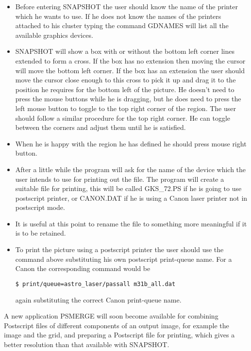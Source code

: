 \documentclass[twoside,11pt]{article}
\begin{document}
\begin{itemize}
\item Before entering SNAPSHOT the user should know the name of the printer
which he wants to use. If he does not know the names of the printers attached
to his cluster typing the command GDNAMES will list all the available graphics 
devices.
\item SNAPSHOT will show a box with or without the bottom left corner lines
extended to form a cross. If the box has no extension then moving the cursor
will move the bottom left corner. If the box has an extension the user should
move the cursor close enough to this cross to pick it up and drag it to
the position he requires for the bottom left of the picture. He doesn't need
to press the mouse buttons while he is dragging, but he does need to press the
left mouse button to toggle to the top right corner of the 
region. The user should follow a similar procedure for the top right corner.
He can toggle between the corners and adjust them until he is satisfied.
\item When he is happy with the region he has defined he should press 
mouse right button.
\item After a little while the program will ask for the name of the device
which the user intends to use for printing out the file. The program will
create a suitable file for printing, this will be called GKS\_72.PS if he is
going to use postscript printer, or CANON.DAT if he is using a Canon laser
printer not in postscript mode.
\item It is useful at this point to rename the file to something more 
meaningful if it is to be retained.
\item To print the picture using a postscript printer the user should use the 
command above substituting his own postscript print-queue name. For a Canon
the corresponding command would be
\begin{small}
\begin{verbatim}
$ print/queue=astro_laser/passall m31b_all.dat
\end{verbatim}
\end{small}
again substituting the correct Canon print-queue name.
\end{itemize}

A new application PSMERGE will soon become available for combining Postscript
files of different components of an output image, for example the image and
the grid, and preparing a Postscript file for printing, which gives a better
resolution than that available with SNAPSHOT.
\end{document}
